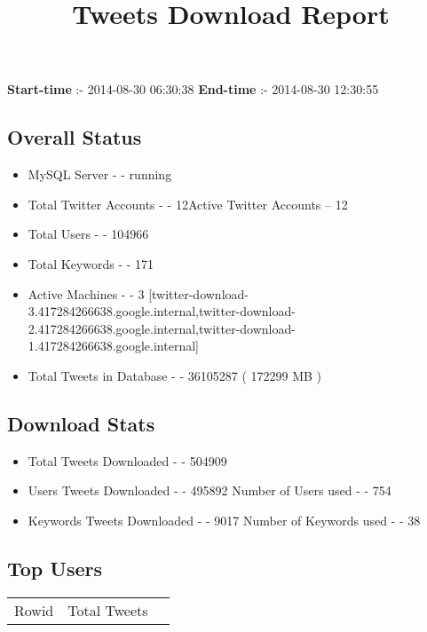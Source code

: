 \documentclass{article}\usepackage[T1]{fontenc}
\begin{document}
\title{\textbf{Tweets Download Report}}
               \date{}
                \maketitle
               \centerline{\textbf{Start-time} :- 2014-08-30 06:30:38 \hspace{40pt} \textbf{End-time} :- 2014-08-30 12:30:55}               \subsection*{Overall Status}                \begin{itemize}                \item MySQL Server - - running               \item Total Twitter Accounts - - 12\newline Active Twitter Accounts -- 12               \item Total Users - - 104966               \item Total Keywords - - 171               \item Active Machines - - 3 [twitter-download-3.417284266638.google.internal,twitter-download-2.417284266638.google.internal,twitter-download-1.417284266638.google.internal]               \item Total Tweets in Database - - 36105287 ( 172299 MB )               \end{itemize}               \subsection*{Download Stats}                \begin{itemize}                \item Total Tweets Downloaded - - 504909               \item Users Tweets Downloaded - - 495892 \newline Number of Users used - - 754               \item Keywords Tweets Downloaded - - 9017 \newline Number of Keywords used - - 38              \end{itemize}              \subsection*{Top Users}\begin{tabular}{|c|c|c|}         \hline         Rowid & Total Tweets \\ 

\end{tabular}
\end{document}
